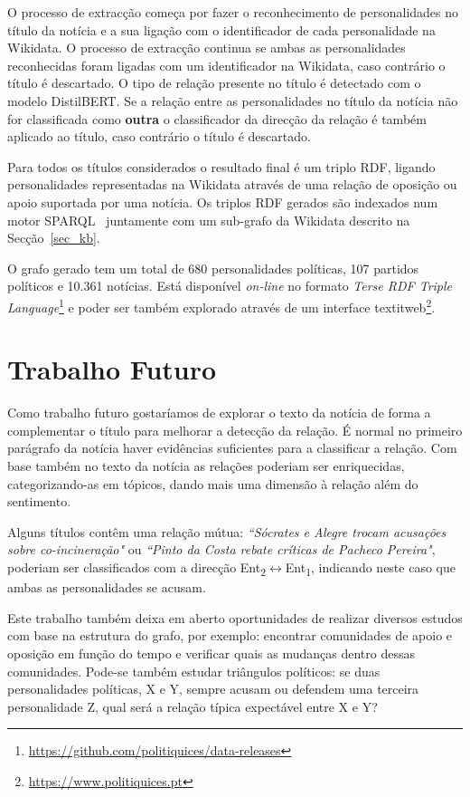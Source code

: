 \documentclass[a4paper, twocolumn, 11pt, twoside]{article}
\begin{document}
O processo de extracção começa por fazer o reconhecimento de personalidades no título da notícia e a sua ligação com o identificador de cada personalidade na Wikidata. O processo de extracção continua se ambas as personalidades reconhecidas foram ligadas com um identificador na Wikidata, caso contrário o título é descartado. O tipo de relação presente no título é detectado com o modelo DistilBERT. Se a relação entre as personalidades no título da notícia não for classificada como \textbf{outra} o classificador da direcção da relação é também aplicado ao título, caso contrário o título é descartado.

Para todos os títulos considerados o resultado final é um triplo RDF, ligando personalidades representadas na Wikidata através de uma relação de oposição ou apoio suportada por uma notícia. Os triplos RDF gerados são indexados num motor SPARQL~\citep{jena2015free} juntamente com um sub-grafo da Wikidata descrito na Secção~\ref{sec_kb}.

O grafo gerado tem um total de 680 personalidades políticas, 107 partidos políticos e 10.361 notícias. Está disponível \textit{on-line} no formato \textit{Terse RDF Triple Language}\footnote{\url{https://github.com/politiquices/data-releases}} e poder ser também explorado através de um interface textit{web}\footnote{\url{https://www.politiquices.pt}}.

\section{Trabalho Futuro}
\label{sec:future_work}

Como trabalho futuro gostaríamos de explorar o texto da notícia de forma a complementar o título para melhorar a detecção da relação. É normal no primeiro parágrafo da notícia haver evidências suficientes para a classificar a relação. Com base também no texto da notícia as relações poderiam ser enriquecidas, categorizando-as em tópicos, dando mais uma dimensão à relação além do sentimento.

Alguns títulos contêm uma relação mútua: \textit{``Sócrates e Alegre trocam acusações sobre co-incineração"} ou \textit{``Pinto da Costa rebate críticas de Pacheco Pereira"}, poderiam ser classificados com a direcção Ent\textsubscript{2}$\leftrightarrow$Ent\textsubscript{1}, indicando neste caso que ambas as personalidades se acusam.

Este trabalho também deixa em aberto oportunidades de realizar diversos estudos com base na estrutura do grafo, por exemplo: encontrar comunidades de apoio e oposição em função do tempo e verificar quais as mudanças dentro dessas comunidades. Pode-se também estudar triângulos políticos: se duas personalidades políticas, X e Y, sempre acusam ou defendem uma terceira personalidade Z, qual será a relação típica expectável entre X e Y?
\end{document}
